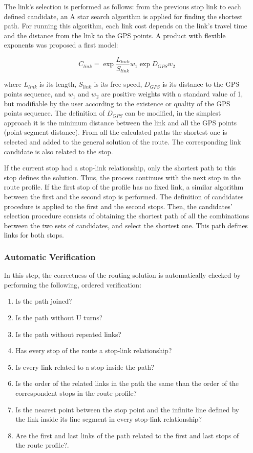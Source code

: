 The link's selection is performed as follows: from the previous stop link to each defined candidate, an A star search algorithm is applied for finding the shortest path. For running this algorithm, each link cost depends on the link's travel time and the distance from the link to the GPS points. A product with flexible exponents was proposed a first model:

\begin{equation}\label{eq:LinkCost}
	C_{link} = \exp{\frac{L_{link}}{S_{link}}}{w_{1}}\exp{D_{GPS}}{w_{2}}
\end{equation}

where $L_{link}$ is its length, $S_{link}$ is its free speed, $D_{GPS}$ is its distance to the GPS points sequence, and $w_{1}$ and $w_{2}$ are positive weights with a standard value of 1, but modifiable by the user according to the existence or quality of the GPS points sequence. The definition of $D_{GPS}$ can be modified, in the simplest approach it is the minimum distance between the link and all the GPS points (point-segment distance). From all the calculated paths the shortest one is selected and added to the general solution of the route. The corresponding link candidate is also related to the stop. 

If the current stop had a stop-link relationship, only the shortest path to this stop defines the solution. Thus, the process continues with the next stop in the route profile. If the first stop of the profile has no fixed link, a similar algorithm between the first and the second stop is performed. The definition of candidates procedure is applied to the first and the second stops. Then, the candidates' selection procedure consists of obtaining the shortest path of all the combinations between the two sets of candidates, and select the shortest one. This path defines links for both stops.

\subsubsection{Automatic Verification}
In this step, the correctness of the routing solution is automatically checked by performing the following, ordered verification:

\begin{enumerate}
\item Is the path joined?
\item Is the path without U turns?
\item Is the path without repeated links?
\item Has every stop of the route a stop-link relationship?
\item Is every link related to a stop inside the path?
\item Is the order of the related links in the path the same than the order of the correspondent stops in the route profile?
\item Is the nearest point between the stop point and the infinite line defined by the link inside its line segment in every stop-link relationship?
\item Are the first and last links of the path related to the first and last  stops of the route profile?.
\end{enumerate}

